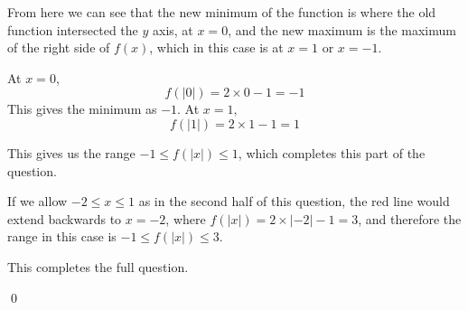 \begin{solution}
\begin{enumerate}
    From here we can see that the new minimum of the function is where the old function intersected the $y$ axis, at $x=0$, and the new maximum is the maximum of the right side of $f(x)$, which in this case is at $x=1$ or $x=-1$.

    At $x=0$, 
    \[f(|0|) = 2\times 0 - 1 = -1\] 
    This gives the minimum as $-1$. At $x=1$, 
    \[ f(|1|) = 2 \times 1 - 1 = 1\]

    This gives us the range $-1 \leq f(|x|) \leq 1$, which completes this part of the question.
    
    If we allow $-2 \leq x \leq 1$ as in the second half of this question, the red line would extend backwards to $x=-2$, where $f(|x|) = 2 \times |-2| - 1 = 3$, and therefore the 
    range in this case is $-1 \leq f(|x|) \leq 3$.
    
    This completes the full question.
\end{enumerate}
    \qed
\end{solution}

